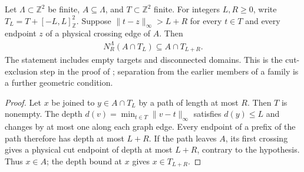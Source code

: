 \begin{lemma}
    \label{thm:area_law_graph_neighborhood_cut_clearance}
    \leanok
    Let $\Lambda\subset\mathbb Z^2$ be finite, $A\subseteq\Lambda$, and
    $T\subset\mathbb Z^2$ finite. For integers $L,R\ge0$, write
    $T_L=T+[-L,L]^2_{\mathbb Z}$. Suppose
    $\|t-z\|_\infty>L+R$ for every $t\in T$ and every endpoint
    $z$ of a physical crossing edge of $A$. Then
    \begin{align}
        N_R^\Lambda(A\cap T_L)\subseteq A\cap T_{L+R}.
    \end{align}
    The statement includes empty targets and disconnected domains. This is
    the cut-exclusion step in the proof of
    \cite[Theorem~1.1]{OpenAI2026AreaLaw}; separation from the earlier
    members of a family is a further geometric condition.
\end{lemma}
\begin{proof}\leanok
    Let $x$ be joined to $y\in A\cap T_L$ by a path of length at most $R$.
    Then $T$ is nonempty. The depth
    $d(v)=\min_{t\in T}\|v-t\|_\infty$ satisfies $d(y)\le L$ and
    changes by at most one along each graph edge. Every endpoint of a
    prefix of the path therefore has depth at most $L+R$.
    If the path leaves $A$, its first crossing gives a physical cut
    endpoint of depth at most $L+R$, contrary to the hypothesis.
    Thus $x\in A$; the depth bound at $x$ gives $x\in T_{L+R}$.
\end{proof}

